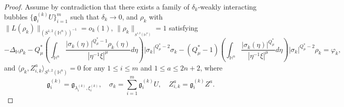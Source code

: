 \documentclass[11pt]{article}
\begin{document}
\begin{proof}
Assume by contradiction that there exists a family of ${\delta_k}$-weakly interacting bubbles $\big\{\mathfrak{g}_{i }^{(k)} U\big\}_{i=1}^m$ such that
$\delta_k\rightarrow0$, and $\rho_k$ with $\|L(\rho_k) \|_{(S^{1,2}(\mathbb{H}^{n}))^{-1}}=o_k(1)$, $\|\rho_k\|_{_{S^{1,2}(\mathbb{H}^{n})}}=1$ satisfying
\begin{equation}\label{main51}
  -\Delta_{\mathbb{H} } \rho_k-Q^{\ast}_{\mu}\left(\int_{\mathbb{H}^{n}}\frac{|\sigma_k(\eta)|^{Q^{\ast}_{\mu}-1}\rho_k(\eta)}
{|\eta^{-1}\xi|^{\mu}}{d}\eta\right)|\sigma_k|^{Q^{\ast}_{\mu}-2}\sigma_k-(Q^{\ast}_{\mu}-1)
\left(\int_{\mathbb{H}^{n}}\frac{|\sigma_k(\eta)|^{Q^{\ast}_{\mu}}}{|\eta^{-1}\xi|^{\mu}}{d}\eta\right)
|\sigma_k|^{Q^{\ast}_{\mu}-2}\rho_k = \varphi_k,
\end{equation}
and $\langle \rho_k, Z_{i,k}^a \rangle_{S^{1,2}(\mathbb{H}^{n})}= 0$ for any $1\leq i\leq m $ and $ 1\leq a\leq 2n+2$,
where
\begin{equation*}
  \mathfrak{g}_i^{(k)}=\mathfrak{g}_{\lambda_i^{(k)},\xi_i^{(k)}},\quad \sigma_k=\sum\limits_{i=1}^m \mathfrak{g}_i^{(k)}U, \quad Z_{i,k}^a=\mathfrak{g}_i^{(k)} Z^a.
\end{equation*}


\end{proof}
\end{document}
